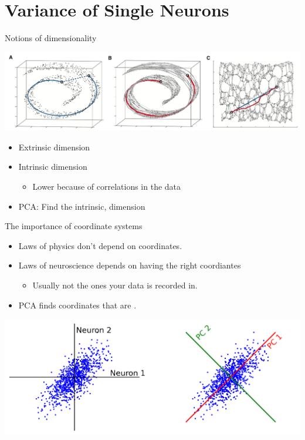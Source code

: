 \documentclass[presentation,smaller]{beamer}
\begin{document}
\section{Variance of Single Neurons}
\label{sec:org5c3f6ee}
\begin{frame}[label={sec:org9ff128c}]{Notions of dimensionality}
\begin{center}
\includegraphics[width=1.0\textwidth]{figures/swiss_roll.png}
\end{center}  
\begin{itemize}
\item Extrinsic dimension
\item Intrinsic dimension
\begin{itemize}
\item Lower because of correlations in the data
\end{itemize}
\item PCA: Find the intrinsic,  dimension
\end{itemize}
\end{frame}
\begin{frame}[label={sec:orgf3f48a8}]{The importance of coordinate systems}
\begin{itemize}
\item Laws of physics don't depend on coordinates.
\item Laws of neuroscience depends on having the right coordiantes
\begin{itemize}
\item Usually not the ones your data is recorded in.
\end{itemize}
\item PCA finds coordinates that are .
\end{itemize}
\begin{center}
\includegraphics[width=1.0\textwidth]{figures/pca_illustration.png}
\end{center}  
\end{frame}
\end{document}
